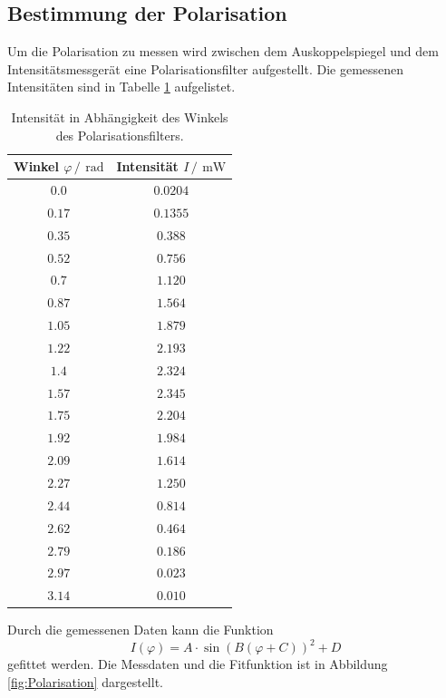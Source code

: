 \subsection{Bestimmung der Polarisation}
Um die Polarisation zu messen wird zwischen dem Auskoppelspiegel und dem Intensitätsmessgerät eine Polarisationsfilter 
aufgestellt. Die gemessenen Intensitäten sind in Tabelle \ref{tab:Polarisation} aufgelistet.
\FloatBarrier
\begin{table}
  \centering
  \caption{Intensität in Abhängigkeit des Winkels des Polarisationsfilters.}
  \label{tab:Polarisation}
  \begin{tabular}{c c}
    \toprule
    Winkel $\varphi \,/\,\SI{}{\radian}$&Intensität $I\,/\,\SI{}{\milli\watt}$\\
    \midrule
    $\num{0.0}$&$\num{0.0204}$\\
    $\num{0.17}$&$\num{0.1355}$\\
    $\num{0.35}$&$\num{0.388}$\\
    $\num{0.52}$&$\num{0.756}$\\
    $\num{0.7}$&$\num{1.120}$\\
    $\num{0.87}$&$\num{1.564}$\\
    $\num{1.05}$&$\num{1.879}$\\
    $\num{1.22}$&$\num{2.193}$\\
    $\num{1.4}$&$\num{2.324}$\\
    $\num{1.57}$&$\num{2.345}$\\
    $\num{1.75}$&$\num{2.204}$\\
    $\num{1.92}$&$\num{1.984}$\\
    $\num{2.09}$&$\num{1.614}$\\
    $\num{2.27}$&$\num{1.250}$\\
    $\num{2.44}$&$\num{0.814}$\\
    $\num{2.62}$&$\num{0.464}$\\
    $\num{2.79}$&$\num{0.186}$\\
    $\num{2.97}$&$\num{0.023}$\\
    $\num{3.14}$&$\num{0.010}$\\
    \bottomrule
  \end{tabular}
\end{table} 
\FloatBarrier
Durch die gemessenen Daten kann die Funktion
\begin{equation}
  \label{eq:Sin2}
  I(\varphi)=A\cdot\sin{\left(B\left(\varphi+C\right)\right)}^2 + D
\end{equation}
gefittet werden.
Die Messdaten und die Fitfunktion ist in Abbildung \ref{fig:Polarisation} dargestellt.

